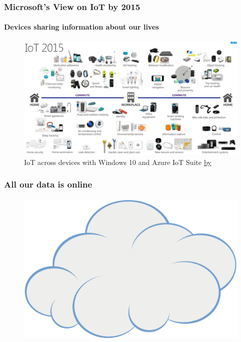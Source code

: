 	\begin{frame}
	\frametitle{Microsoft's View on IoT by 2015}
	\framesubtitle{Devices sharing information about our lives}
	        \begin{figure}[h]
                \centering
                \includegraphics[width=.8\textwidth]{../pics/msft-IoT2015}
		\caption{IoT across devices with Windows 10 and Azure IoT Suite \href{http://www.slideshare.net/BosniaAgile/iot-across-devices-with-windows-10-and-azure-iot-suite-by-admir-tuzovi}{by \cite{admir}}}
        	\end{figure}
	\end{frame}

	\begin{frame}
	\frametitle{All our data is online}
	\framesubtitle{}
	        \begin{figure}[h]
                \centering
                \includegraphics[width=.8\textwidth]{../pics/Cartoon_cloud.png}
        	\end{figure}
	\end{frame}

